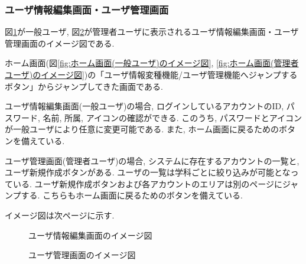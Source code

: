 \documentclass[11ptm]{jsarticle}
\begin{document}
\clearpage
\subsubsection{ユーザ情報編集画面・ユーザ管理画面}
\label{sec:ユーザ情報編集画面・ユーザ管理画面}
図\ref{fig:ユーザ情報編集画面のイメージ図}が一般ユーザ, 図\ref{fig:ユーザ管理画面のイメージ図}が管理者ユーザに表示されるユーザ情報編集画面・ユーザ管理画面のイメージ図である. \par
ホーム画面(図\ref{fig:ホーム画面(一般ユーザ)のイメージ図}, \ref{fig:ホーム画面(管理者ユーザ)のイメージ図})の「ユーザ情報変種機能/ユーザ管理機能へジャンプするボタン」からジャンプしてきた画面である. \par
ユーザ情報編集画面(一般ユーザ)の場合, ログインしているアカウントのID, パスワード, 名前, 所属, アイコンの確認ができる. このうち, パスワードとアイコンが一般ユーザにより任意に変更可能である. また, ホーム画面に戻るためのボタンを備えている. \par
ユーザ管理画面(管理者ユーザ)の場合, システムに存在するアカウントの一覧と, ユーザ新規作成ボタンがある. ユーザの一覧は学科ごとに絞り込みが可能となっている. ユーザ新規作成ボタンおよび各アカウントのエリアは別のページにジャンプする. こちらもホーム画面に戻るためのボタンを備えている. \par
イメージ図は次ページに示す.
\clearpage
\begin{figure}[h]
  \centering
  \caption{\label{fig:ユーザ情報編集画面のイメージ図}ユーザ情報編集画面のイメージ図}
\end{figure}
\begin{figure}[h]
  \centering
  \caption{\label{fig:ユーザ管理画面のイメージ図}ユーザ管理画面のイメージ図}
\end{figure}
\end{document}
